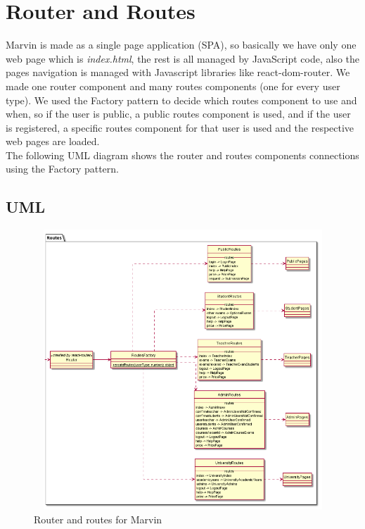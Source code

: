 \documentclass[../react]{subfiles}
\begin{document}
	\section{Router and Routes} Marvin is made as a single page application (SPA), so basically we have only one web page which is \textit{index.html}, the rest is all managed by JavaScript code, also the pages navigation is managed with Javascript libraries like react-dom-router. We made one router component and many routes components (one for every user type). We used the  Factory pattern to decide which routes component to use and when, so if the user is public, a public routes component is used, and if the user is registered, a specific routes component for that user is used and the respective web pages are loaded. \\
	The following UML diagram shows the router and routes components connections using the Factory pattern.
		\subsection{UML}
			\begin{figure}[h]
			\centering
			\includegraphics[width=13cm,height=10.5cm]{"diagrammi/react/routes"}
			\caption{Router and routes for Marvin}
			\label{fig:Router and routes for Marvin}
		\end{figure}
		\newpage
	
\end{document}

